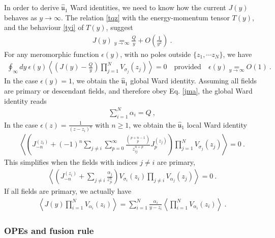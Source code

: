 \documentclass[12pt, a4paper, notitlepage, twoside]{report}
\numberwithin{equation}{section}
\theoremstyle{break}
\begin{document}
In order to derive $\hat{\mathfrak{u}}_1$ Ward identities, we need to know how the current $J(y)$ behaves as $y\to \infty$.
The relation \eqref{tqz} with the energy-momentum tensor $T(y)$, and the behaviour \eqref{tyi} of $T(y)$, suggest
\begin{align}
 \boxed{J(y) \underset{y\to \infty}{=} \frac{Q}{y} + O\left(\frac{1}{y^2}\right)}\ .
\label{jyi}
\end{align}
For any meromorphic function $\epsilon(y)$, with no poles outside $\{z_1,\cdots z_N\}$, we have 
\begin{align}
 \oint_\infty dy\ \epsilon(y) \left\langle \left(J(y)-\frac{Q}{y}\right)\prod_{j=1}^N V_{\sigma_j}(z_j)\right\rangle = 0   \quad \text{provided} \quad \epsilon(y) \underset{y\to\infty}{=} O(1)\ .
\end{align}
In the case $\epsilon(y)=1$, we obtain the $\hat{\mathfrak{u}}_1$ global Ward identity.
Assuming all fields are primary or descendant fields, and therefore obey Eq. \eqref{jma}, the global Ward identity reads
\begin{align}
 \boxed{\sum_{i=1}^N \alpha_i = Q} \ ,
\label{saq}
\end{align}
In the case $\epsilon(z) = \frac{1}{(z-z_i)^{n}}$ with $n\geq 1$, we obtain the $\hat{\mathfrak{u}}_1$ local Ward identity
\begin{align}
\left\langle \left(J_{-n}^{(z_i)}+ (-1)^{n}\sum_{j\neq i}\sum_{p=0}^\infty \frac{\binom{p+n-1}{p}}{z_{ij}^{n+p}}  J_p^{(z_j)}\right)\prod_{j=1}^N V_{\sigma_j}(z_j) \right\rangle = 0\ .
\label{jnjp}
\end{align}
This simplifies when the fields with indices $j\neq i$ are primary, 
\begin{align}
 \left\langle \left(J_{-n}^{(z_i)}  + \sum_{j\neq i} \frac{\alpha_j}{z_{ji}^n}\right) V_{\sigma_i}(z_i)\prod_{j\neq i} V_{\alpha_j}(z_j)\right\rangle= 0\ .
\label{jnz}
\end{align}
If all fields are primary, we actually have 
\begin{align}
 \boxed{\left\langle J(y) \prod_{i=1}^N V_{\alpha_i}(z_i) \right\rangle = \sum_{i=1}^N \frac{\alpha_i}{y-z_i} \left\langle \prod_{i=1}^N V_{\alpha_i}(z_i) \right\rangle  }\ .
\label{jsa}
\end{align}

\subsubsection{OPEs and fusion rule}
\end{document}
